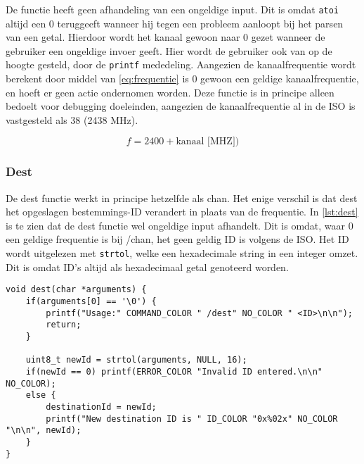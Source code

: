 De functie heeft geen afhandeling van een ongeldige input. Dit is omdat \texttt{atoi} altijd een 0 teruggeeft wanneer hij tegen een probleem aanloopt bij het parsen van een getal. Hierdoor wordt het kanaal gewoon naar 0 gezet wanneer de gebruiker een ongeldige invoer geeft. Hier wordt de gebruiker ook van op de hoogte gesteld, door de \texttt{printf} mededeling. Aangezien de kanaalfrequentie wordt berekent door middel van \autoref{eq:frequentie} is 0 gewoon een geldige kanaalfrequentie, en hoeft er geen actie ondernomen worden. Deze functie is in principe alleen bedoelt voor debugging doeleinden, aangezien de kanaalfrequentie al in de ISO is vastgesteld als 38 (2438 MHz).

\begin{equation} \label{eq:frequentie}
    f = 2400 + \textrm{kanaal [MHZ]})
\end{equation}

\subsubsection{Dest}
De dest functie werkt in principe hetzelfde als chan. Het enige verschil is dat dest het opgeslagen bestemmings-ID verandert in plaats van de frequentie. In \autoref{lst:dest} is te zien dat de dest functie wel ongeldige input afhandelt. Dit is omdat, waar 0 een geldige frequentie is bij /chan, het geen geldig ID is volgens de ISO. Het ID wordt uitgelezen met \texttt{strtol}, welke een hexadecimale string in een integer omzet. Dit is omdat ID's altijd als hexadecimaal getal genoteerd worden.

\begin{lstlisting}[caption={De dest functie},captionpos=b,label={lst:dest},style=c,xleftmargin=.\textwidth,xrightmargin=.\textwidth]
void dest(char *arguments) {
    if(arguments[0] == '\0') {
        printf("Usage:" COMMAND_COLOR " /dest" NO_COLOR " <ID>\n\n");
        return;
    }

    uint8_t newId = strtol(arguments, NULL, 16);
    if(newId == 0) printf(ERROR_COLOR "Invalid ID entered.\n\n" NO_COLOR);
    else {
        destinationId = newId;
        printf("New destination ID is " ID_COLOR "0x%02x" NO_COLOR "\n\n", newId);
    }
}
\end{lstlisting}


